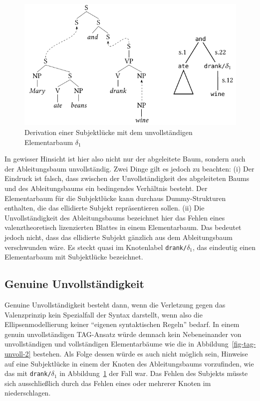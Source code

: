 \begin{figure}[t]
\centering
\includegraphics{graphics/abb832.pdf}
\caption{\label{fig-tag-unvoll-3}Derivation einer Subjektlücke mit dem unvollständigen Elementarbaum $\delta_1$}
\end{figure}
In gewisser Hinsicht ist hier also nicht nur der abgeleitete Baum, sondern auch der Ableitungsbaum unvollständig. Zwei Dinge gilt es jedoch zu beachten: (i) Der Eindruck ist falsch, dass zwischen der Unvollständigkeit des abgeleiteten Baums und des Ableitungsbaums ein bedingendes Verhältnis besteht. Der Elementarbaum für die Subjektlücke kann durchaus Dummy-Strukturen enthalten, die das ellidierte Subjekt repräsentieren sollen. (ii) Die Unvollständigkeit des Ableitungsbaums bezeichnet hier das Fehlen eines valenztheoretisch lizenzierten Blattes in einem Elementarbaum. Das bedeutet jedoch nicht, dass das ellidierte Subjekt gänzlich aus dem Ableitungsbaum verschwunden wäre. Es steckt quasi im Knotenlabel {\tt drank/$\delta_1$}, das eindeutig einen Elementarbaum mit Subjektlücke bezeichnet. 




\subsection{Genuine Unvollständigkeit}

Genuine Unvollständigkeit besteht dann, wenn die Verletzung gegen das Valenzprinzip kein Spezialfall der Syntax darstellt, wenn also die Ellipsenmodellierung keiner "`eigenen syntaktischen Regeln"' bedarf. In einem genuin unvollständigen TAG-Ansatz würde demnach kein Nebeneinander von unvollständigen und vollständigen Elementarbäume wie die in Abbildung~\ref{fig-tag-unvoll-2} bestehen. Als Folge dessen würde es auch nicht möglich sein, Hinweise auf eine Subjektlücke in einem der Knoten des Ableitungsbaums vorzufinden, wie das mit {\tt drank/$\delta_1$} in Abbildung~\ref{fig-tag-unvoll-3} der Fall war. Das Fehlen des Subjekts müsste sich ausschlie\ss lich durch das Fehlen eines oder mehrerer Knoten im  niederschlagen. 

